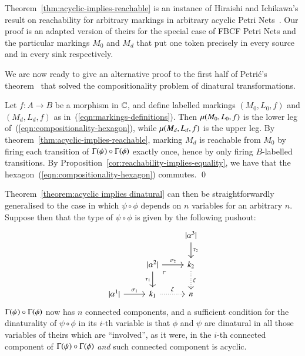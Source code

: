 \begin{remark}
	Theorem~\ref{thm:acyclic-implies-reachable} is an instance of Hiraishi and Ichikawa's result on reachability for arbitrary markings in arbitrary acyclic Petri Nets~\cite{hiraishi_class_1988}. Our proof is an adapted version of theirs for the special case of FBCF Petri Nets and the particular markings $M_0$ and $M_d$ that put one token precisely in every source and in every sink respectively.
\end{remark}

We are now ready to give an alternative proof to the first half of Petri\'{c}'s theorem~\cite{petric_g-dinaturality_2003} that solved the compositionality problem of dinatural transformations.

\begin{proofMainTheorem}
	Let $f \colon A \to B$ be a morphism in $\mathbb C$, and define labelled markings $(M_0,L_0,f)$ and $(M_d,L_d,f)$ as in~(\ref{eqn:markings-definitions}). Then $\mu(M_0,L_0,f)$ is the lower leg of~(\ref{eqn:compositionality-hexagon}), while $\mu(M_d,L_d,f)$ is the upper leg. By theorem~\ref{thm:acyclic-implies-reachable}, marking $M_d$ is reachable from $M_0$ by firing each transition of $\graph\psi \circ \graph\phi$ exactly once, hence by only firing $B$-labelled transitions. By Proposition~\ref{cor:reachability-implies-equality}, we have that the hexagon~(\ref{eqn:compositionality-hexagon}) commutes. \qed
\end{proofMainTheorem}

Theorem~\ref{theorem:acyclic implies dinatural} can then be straightforwardly generalised to the case in which $\psi\circ\phi$ depends on $n$ variables for an arbitrary $n$. Suppose then that the type of $\psi\circ\phi$ is given by the following pushout: 
\begin{equation}\label{eqn:pushout2}
\mkern0mu \begin{tikzcd}
& & \length{\alpha^3} \ar[d, "\tau_2"] \\
& \length{\alpha^2} \ar[d, "\tau_1"'] \ar[dr, phantom, "\ulcorner" very near start] \ar[r, "\sigma_2"] & k_2 \ar[d, dotted, "\xi"] \\
\length{\alpha^1} \ar[r, "\sigma_1"] & k_1 \ar[r, dotted, "\zeta"] & n
\end{tikzcd}
\end{equation}
$\graph\psi \circ \graph\phi$ now has $n$ connected components, and a sufficient condition for the dinaturality of $\psi\circ\phi$ in its $i$-th variable is that $\phi$ and $\psi$ are dinatural in all those variables of theirs which are ``involved'', as it were, in the $i$-th connected component of $\graph\psi \circ \graph\phi$ \emph{and} such connected component is acyclic.

